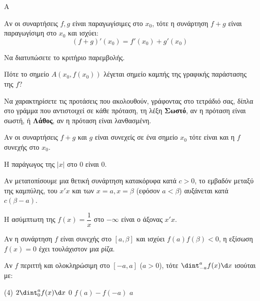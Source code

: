 \begin{thema}{A}
\begin{erwthma}
    \item Αν οι συναρτήσεις $ f,g $ είναι παραγωγίσιμες στο $ x_0 $, τότε η συνάρτηση $ f+g $ είναι παραγωγίσιμη στο $ x_0 $ και ισχύει: \[ (f+g)'(x_0)=f'(x_0)+g'(x_0) \]
    \item Να διατυπώσετε το κριτήριο παρεμβολής.
    \item Πότε το σημείο $A(x_0, f(x_0))$ λέγεται σημείο καμπής της γραφικής παράστασης της $f$?
    \item Να χαρακτηρίσετε τις προτάσεις που ακολουθούν, γράφοντας στο τετράδιό σας, δίπλα στο γράμμα που αντιστοιχεί σε κάθε πρόταση, τη λέξη \textbf{Σωστό}, αν η πρόταση είναι σωστή, ή \textbf{Λάθος}, αν η πρόταση είναι λανθασμένη.
    \begin{alist}
        \item Αν οι συναρτήσεις $f+g$ και $g$ είναι συνεχείς σε ένα σημείο $x_0$ τότε είναι και η $f$ συνεχής στο $x_0$.
        \item Η παράγωγος της $|x|$ στο $0$ είναι $0$.
        \item Αν μετατοπίσουμε μια θετική συνάρτηση κατακόρυφα κατά $c>0$, το εμβαδόν μεταξύ της καμπύλης, του $x'x$ και των $x=a, x=\beta$ (εφόσον $a<\beta$) αυξάνεται κατά $c(\beta-a)$.
        \item H ασύμπτωτη της $f(x)=\dfrac{1}{x}$ στο $-\infty$ είναι ο άξονας $x'x$.
        \item Αν η συνάρτηση $f$ είναι συνεχής στο $[a, \beta]$ και ισχύει $f(a)f(\beta)<0$, η εξίσωση $f(x)=0$ έχει τουλάχιστον μια ρίζα.
    \end{alist}
    \item Αν $f$ περιττή και ολοκληρώσιμη στο $[-a, a]$ ($a > 0$), τότε $\dint_{-a}^{a} f(x) \d x$ ισούται με:
    \begin{tasks}[label=\let\textdexiakeraia\relax\alph*.](4)
        \task $2 \dint_0^a f(x)\d x$
        \task $0$
        \task $f(a) - f(-a)$
        \task $a$
    \end{tasks}
\end{erwthma}
\end{thema}


